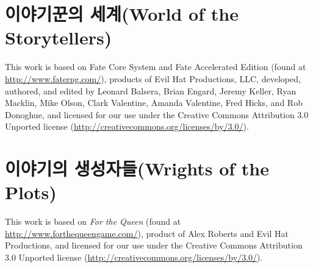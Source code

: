 \documentclass{report}
\begin{document}
	\section*{이야기꾼의 세계(World of the Storytellers)}
	
	This work is based on Fate Core System and Fate Accelerated Edition (found at \url{http://www.faterpg.com/}), products of Evil Hat Productions, LLC, developed, authored, and edited by Leonard Balsera, Brian Engard, Jeremy Keller, Ryan Macklin, Mike Olson, Clark Valentine, Amanda Valentine, Fred Hicks, and Rob Donoghue, and licensed for our use under the Creative Commons Attribution 3.0 Unported license (\url{http://creativecommons.org/licenses/by/3.0/}).
	
	\section*{이야기의 생성자들(Wrights of the Plots)}
	
	This work is based on \textit{For the Queen} (found at \url{http://www.forthequeengame.com/}), product of Alex Roberts and Evil Hat Productions, and licensed for our use under the Creative Commons Attribution 3.0 Unported license (\url{http://creativecommons.org/licenses/by/3.0/}). 
	
\end{document}
